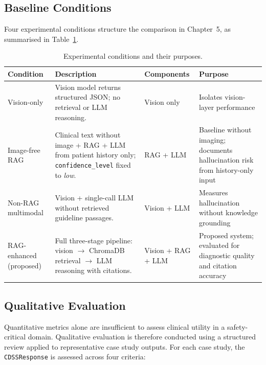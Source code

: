 \documentclass[12pt,a4paper]{report}
\begin{document}
\subsection{Baseline Conditions}
\label{subsec:baselines}

Four experimental conditions structure the comparison in Chapter~5, as
summarised in Table~\ref{tab:baselines}.

\begin{table}[H]
\centering
\caption{Experimental conditions and their purposes.}
\label{tab:baselines}
\small
\renewcommand{\arraystretch}{1.3}
\begin{tabularx}{\textwidth}{@{}l X l X@{}}
\toprule
\textbf{Condition} & \textbf{Description} & \textbf{Components} & \textbf{Purpose} \\
\midrule
Vision-only
  & Vision model returns structured JSON; no retrieval or LLM reasoning.
  & Vision only
  & Isolates vision-layer performance \\[4pt]
Image-free RAG
  & Clinical text without image + RAG + LLM from patient
    history only; \texttt{confidence\_level} fixed to \textit{low}.
  & RAG + LLM
  & Baseline without imaging; documents hallucination risk from history-only input \\[4pt]
Non-RAG multimodal
  & Vision + single-call LLM without retrieved guideline passages.
  & Vision + LLM
  & Measures hallucination without knowledge grounding \\[4pt]
RAG-enhanced (proposed)
  & Full three-stage pipeline: vision $\rightarrow$ ChromaDB retrieval
    $\rightarrow$ LLM reasoning with citations.
  & Vision + RAG + LLM
  & Proposed system; evaluated for diagnostic quality and citation accuracy \\
\bottomrule
\end{tabularx}
\end{table}

\subsection{Qualitative Evaluation}
\label{subsec:qualitative}

Quantitative metrics alone are insufficient to assess clinical utility
in a safety-critical domain.  Qualitative evaluation is therefore
conducted using a structured review applied to representative case study
outputs.  For each case study, the \texttt{CDSSResponse} is assessed
across four criteria:
\end{document}
